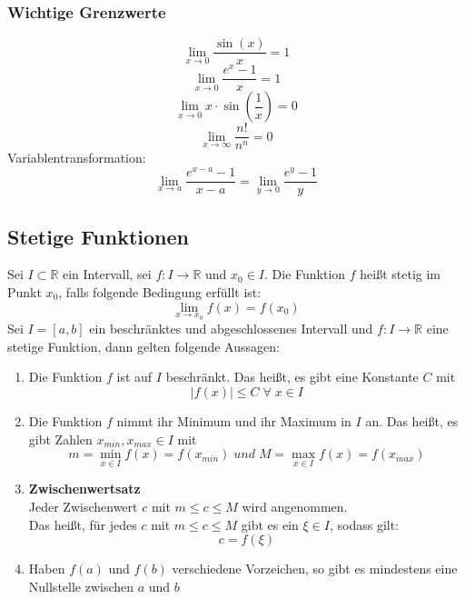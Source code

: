\documentclass[a4paper,twocolumn,10pt]{article}
\begin{document}
\subsubsection{Wichtige Grenzwerte}
\begin{equation*}
\lim\limits_{x\rightarrow 0}\frac{\sin(x)}{x}=1
\end{equation*}
\begin{equation*}
\lim\limits_{x\rightarrow 0}\frac{e^x-1}{x}=1
\end{equation*}
\begin{equation*}
\lim\limits_{x\rightarrow 0}x\cdot \sin(\frac{1}{x})=0
\end{equation*}
\begin{equation*}
\lim\limits_{x\rightarrow \infty} \frac{n!}{n^n}=0
\end{equation*}
Variablentransformation:
\begin{equation*}
\lim\limits_{x\rightarrow a}\frac{e^{x-a}-1}{x-a}=\lim\limits_{y\rightarrow 0}\frac{e^y-1}{y}
\end{equation*}

\subsection{Stetige Funktionen}
Sei $I\subset\mathbb{R}$ ein Intervall, sei $f:I\rightarrow\mathbb{R}$ und $x_0\in I$. Die Funktion $f$ heißt stetig im Punkt $x_0$, falls folgende Bedingung erfüllt ist:
\begin{equation*}
\lim\limits_{x\rightarrow x_0}f(x)=f(x_0)
\end{equation*}
Sei $I=[a,b]$ ein beschränktes und abgeschlossenes Intervall und $f:I\rightarrow\mathbb{R}$ eine stetige Funktion, dann gelten folgende Aussagen:
\begin{enumerate}
\item Die Funktion $f$ ist auf $I$ beschränkt. Das heißt, es gibt eine Konstante $C$ mit
\begin{equation*}
|f(x)|\leq C\;\forall\;x\in I
\end{equation*}
\item Die Funktion $f$ nimmt ihr Minimum und ihr Maximum in $I$ an. Das heißt, es gibt Zahlen $x_{min},x_{max}\in I$ mit
\begin{equation*}
m=\min\limits_{x\in I}f(x)=f(x_{min})\;und\;M=\max\limits_{x\in I}f(x)=f(x_{max})
\end{equation*}
\item \textbf{Zwischenwertsatz}\\
Jeder Zwischenwert $c$ mit $m\leq c\leq M$ wird angenommen.\\
Das heißt, für jedes $c$ mit $m\leq c\leq M$ gibt es ein $\xi\in I$, sodass gilt:
\begin{equation*}
c=f(\xi)
\end{equation*}
\item Haben $f(a)$ und $f(b)$ verschiedene Vorzeichen, so gibt es mindestens eine Nullstelle zwischen $a$ und $b$
\end{enumerate}
\end{document}
